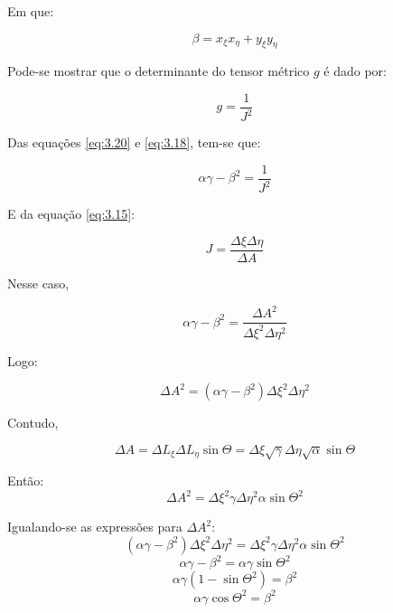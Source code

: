 Em que:

\begin{equation}
    \label{eq:3.19}
    \beta = x_\xi x_\eta + y_\xi y_\eta
\end{equation}

Pode-se mostrar que o determinante do tensor métrico $g$ é dado por:

\begin{equation}
    \label{eq:3.20}
    g = \frac{1}{J^2}
\end{equation}

Das equações \ref{eq:3.20} e \ref{eq:3.18}, tem-se que:

\begin{equation*}
    \alpha \gamma - \beta^2 = \frac{1}{J^2}
\end{equation*}

E da equação \ref{eq:3.15}:

\begin{equation*}
    J=\frac{\Delta \xi \Delta \eta}{\Delta A}
\end{equation*}


Nesse caso,

\begin{equation*}
    \alpha \gamma - \beta^2 = \frac{\Delta A^2}{\Delta \xi^2 \Delta \eta^2}
\end{equation*}

Logo:

\begin{equation*}
    \Delta A^2 = (\alpha \gamma - \beta^2)\Delta \xi^2 \Delta \eta^2
\end{equation*}

Contudo,

\begin{equation*}
    \Delta A = \Delta L_\xi \Delta L_\eta \sin{\Theta} = \Delta \xi \sqrt{\gamma} \Delta \eta \sqrt{\alpha} \sin{\Theta}
\end{equation*}

Então:
\begin{equation*}
    \Delta A^2 = \Delta \xi^2 \gamma \Delta \eta^2 \alpha \sin{\Theta}^2
\end{equation*}

Igualando-se as expressões para $\Delta A^2$:
\begin{equation*}
    (\alpha \gamma - \beta^2)\Delta\xi^2 \Delta \eta^2 = \Delta \xi^2 \gamma \Delta \eta^2 \alpha \sin{\Theta}^2
\end{equation*}
\begin{equation*}
    \alpha \gamma - \beta^2 = \alpha \gamma \sin{\Theta}^2
\end{equation*}
\begin{equation*}
    \alpha \gamma(1-\sin{\Theta}^2) = \beta^2
\end{equation*}
\begin{equation*}
    \alpha \gamma \cos{\Theta}^2 = \beta^2
\end{equation*}

